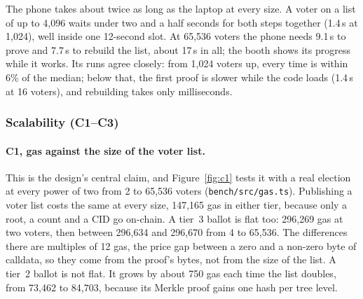 The phone takes about twice as long as the laptop at every size. A voter on
a list of up to 4,096 waits under two and a half seconds for both steps
together (1.4\,s at 1,024), well inside one 12-second slot. At 65,536 voters the phone needs 9.1\,s to
prove and 7.7\,s to rebuild the list, about 17\,s in all; the booth shows its
progress while it works. Its runs agree closely: from 1,024 voters up, every
time is within 6\% of the median; below that, the first proof is slower while
the code loads (1.4\,s at 16 voters), and rebuilding takes only milliseconds.

\subsubsection{Scalability (C1--C3)}

\paragraph{C1, gas against the size of the voter list.}
This is the design's central claim, and Figure~\ref{fig:c1} tests it with a
real election at every power of two from 2 to 65,536 voters
(\texttt{bench/src/gas.ts}). Publishing a voter list costs the same at every
size, 147,165 gas in either tier, because only a root, a count and a CID go
on-chain. A tier~3 ballot is flat too: 296,269 gas at two voters, then between
296,634 and 296,670 from 4 to 65,536. The differences
there are multiples of 12 gas, the price gap between a zero and a non-zero
byte of calldata, so they come from the proof's bytes, not from the size of
the list. A tier~2 ballot is not flat. It grows by
about 750 gas each time the list doubles, from 73,462 to 84,703, because its
Merkle proof gains one hash per tree level.

